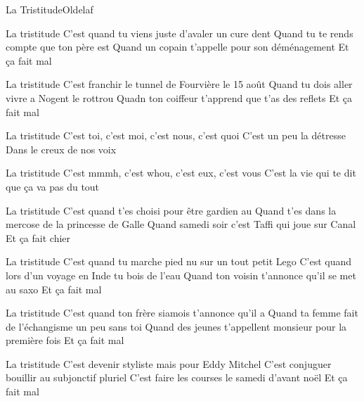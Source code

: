 \documentclass[a4paper,11pt,french]{article}
\begin{document}
\begin{Song}[Tristitude]{La Tristitude}{Oldelaf}

\begin{multicols}{2}
\begin{Verse}
La tristitude
C'est quand tu viens juste d'avaler un cure dent
Quand tu te rends compte que ton père est 
Quand un copain t'appelle pour son déménagement
Et ça fait mal
\espaceInterStrophe

La tristitude
C'est franchir le tunnel de Fourvière le 15 août
Quand tu dois aller vivre a Nogent le rottrou
Quadn ton coiffeur t'apprend que t'as des reflets 
Et ça fait mal
\end{Verse}
\espaceInterStrophe

\begin{Chorus}
La tristitude
C'est toi, c'est moi, c'est nous, c'est quoi
C'est un peu la détresse 
Dans le creux de nos voix
\espaceInterStrophe

La tristitude
C'est mmmh, c'est whou, c'est eux, c'est vous
C'est la vie qui te dit que ça va pas du tout
\end{Chorus}
\vfill
\columnbreak

\begin{Verse}
La tristitude
C'est quand t'es choisi pour être gardien au 
Quand t'es dans la mercose de la princesse de Galle
Quand samedi soir c'est Taffi qui joue sur Canal
Et ça fait chier
\espaceInterStrophe

La tristitude
C'est quand tu marche pied nu sur un tout petit Lego
C'est quand lors d'un voyage en Inde tu bois de l'eau
Quand ton voisin t'annonce qu'il se met au saxo
Et ça fait mal
\end{Verse}
\espaceInterStrophe

\aurefrain 
\espaceInterStrophe

\begin{Verse}
La tristitude
C'est quand ton frère siamois t'annonce qu'il a 
Quand ta femme fait de l'échangisme un peu sans toi
Quand des jeunes t'appellent monsieur pour la première fois
Et ça fait mal
\espaceInterStrophe

La tristitude
C'est devenir styliste mais pour Eddy Mitchel
C'est conjuguer bouillir au subjonctif pluriel
C'est faire les courses le samedi d'avant noël
Et ça fait mal
\end{Verse}
\espaceInterStrophe

\aurefrain

\end{multicols}
\vfill


\end{Song}
\end{document}
